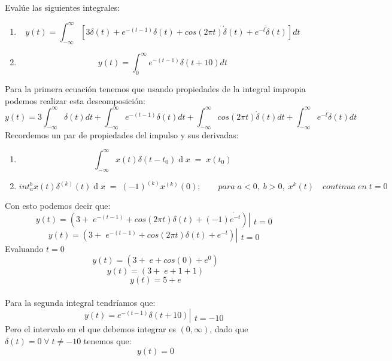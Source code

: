 \documentclass[10pt,a4paper]{report}
\begin{document}
Evalúe las siguientes integrales:
\begin{enumerate}
  \item \[ y(t)= \int_{-\infty }^{\infty }[3\delta (t)+e^{-(t-1)}\delta (t)+cos(2\pi t)\dot{\delta}(t)+e^{-t}\ddot{\delta}(t)]dt \]

  \item \[ y(t)=\int_{0}^{\infty }e^{-(t-1)}\delta (t+10)dt \]

\end{enumerate}
Para la primera ecuación tenemos que usando propiedades de la integral impropia podemos realizar esta descomposición:
\[ y(t)=3\int_{-\infty }^{\infty }\delta (t)dt+\int_{-\infty }^{\infty }e^{-(t-1)}\delta (t)dt+\int_{-\infty }^{\infty }cos(2\pi t)\dot{\delta}(t)dt+\int_{-\infty }^{\infty }e^{-t}\ddot{\delta}(t)dt \]
Recordemos un par de propiedades del impulso y sus derivadas:
\begin{enumerate}
  \item \[ \int_{-\infty}^\infty x\left(t\right)\delta\left(t-t_0\right)\operatorname dx\;=\;x\left(t_0\right) \]
  \item \[ int_a^bx\left(t\right)\delta^{\left(k\right)}\left(t\right)\operatorname dx\;=\;\left(-1\right)^{\left(k\right)}x^{\left(k\right)}\left(0\right); \qquad para \;a<0,\;b>0, \;x^k\left(t\right) \quad continua\;en\;t=0 \]
\end{enumerate}
Con esto podemos decir que:
\[ y\left(t\right) = \left(3+\;e^{-\left(t-1\right)}+cos\left(2\pi t\right)\delta\left(t\right)+\left(-1\right)\dot{e^{-t}}\right)\left|\begin{array}{l}\\t=0\end{array}\right. \]
\[ y\left(t\right) = \left(3+\;e^{-\left(t-1\right)}+cos\left(2\pi t\right)\delta\left(t\right)+{e^{-t}}\right)\left|\begin{array}{l}\\t=0\end{array}\right. \]
Evaluando $t=0$
\[ y\left(t\right) = \left(3+\;e+cos\left(0\right)+e^0\right) \]
\[ y\left(t\right) = \left(3+\;e+1+1\right) \]
\[ y\left(t\right) = 5+e \]\\
Para la segunda integral tendríamos que:
\[ y\left(t\right)= e^{-\left(t-1\right)}\delta\left(t+10\right)\left|\begin{array}{l}\\t=-10\end{array}\right. \]
Pero el intervalo en el que debemos integrar es $\left(0,\infty\right)$, dado que $\delta\left(t\right) = 0 \; \forall \; t \neq -10$ tenemos que:
\[ y\left(t\right)= 0 \] 
\end{document}
